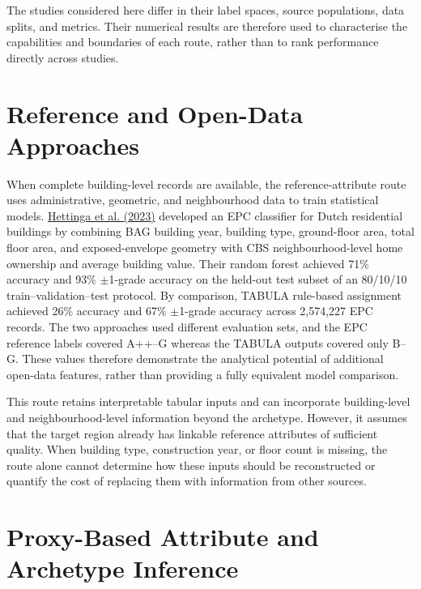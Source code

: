 The studies considered here differ in their label spaces, source populations, data splits, and metrics. Their numerical results are therefore used to characterise the capabilities and boundaries of each route, rather than to rank performance directly across studies.


\section{Reference and Open-Data Approaches}
\label{sec:2_2}


When complete building-level records are available, the reference-attribute route uses administrative, geometric, and neighbourhood data to train statistical models. \hyperlink{ref:hettinga2023}{Hettinga et al. (2023)} developed an EPC classifier for Dutch residential buildings by combining BAG building year, building type, ground-floor area, total floor area, and exposed-envelope geometry with CBS neighbourhood-level home ownership and average building value. Their random forest achieved 71\% accuracy and 93\% \ensuremath{\pm}1-grade accuracy on the held-out test subset of an 80/10/10 train--validation--test protocol. By comparison, TABULA rule-based assignment achieved 26\% accuracy and 67\% \ensuremath{\pm}1-grade accuracy across 2,574,227 EPC records. The two approaches used different evaluation sets, and the EPC reference labels covered A++--G whereas the TABULA outputs covered only B--G. These values therefore demonstrate the analytical potential of additional open-data features, rather than providing a fully equivalent model comparison.


This route retains interpretable tabular inputs and can incorporate building-level and neighbourhood-level information beyond the archetype. However, it assumes that the target region already has linkable reference attributes of sufficient quality. When building type, construction year, or floor count is missing, the route alone cannot determine how these inputs should be reconstructed or quantify the cost of replacing them with information from other sources.


\section{Proxy-Based Attribute and Archetype Inference}
\label{sec:2_3}



